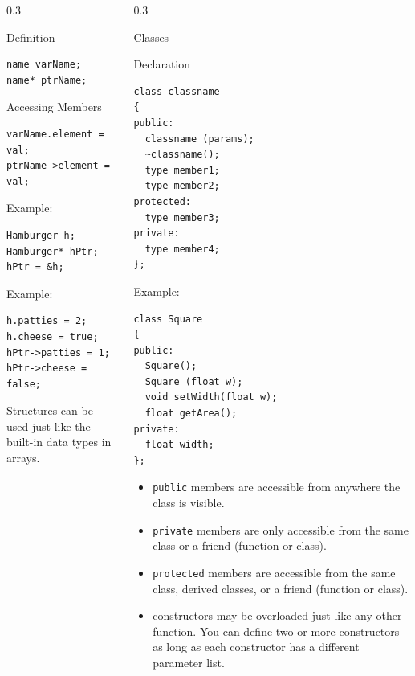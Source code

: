\documentclass[final]{beamer}
\begin{document}
\begin{frame}[t,fragile]
\begin{columns}[t,totalwidth=0.95\paperwidth, colsep=0.05\paperwidth]
\begin{column}{0.3\paperwidth}
\begin{block}{Definition}
\begin{lstlisting}
name varName;
name* ptrName;
\end{lstlisting}
\end{block}

\begin{block}{Accessing Members}
\begin{lstlisting}
varName.element = val;
ptrName->element = val;
\end{lstlisting}
Example:
\begin{lstlisting}
Hamburger h;
Hamburger* hPtr;
hPtr = &h;
\end{lstlisting}
Example:
\begin{lstlisting}
h.patties = 2;
h.cheese = true;
hPtr->patties = 1;
hPtr->cheese = false;
\end{lstlisting}
Structures can be used just like the built-in data types in arrays.
\end{block}

\end{column}
\begin{column}{0.3\paperwidth}

\begin{block}{Classes}
\end{block}

\begin{block}{Declaration}
\begin{lstlisting}
class classname
{
public:
  classname (params);
  ~classname();
  type member1;
  type member2;
protected:
  type member3;
private:
  type member4;
};
\end{lstlisting}
Example:
\begin{lstlisting}
class Square
{
public:
  Square();
  Square (float w);
  void setWidth(float w);
  float getArea();
private:
  float width;
};
\end{lstlisting}
\begin{itemize}
    \item \texttt{public} members are accessible from anywhere the class is visible.
    \item \texttt{private} members are only accessible from the same class or a friend (function or class).
    \item \texttt{protected} members are accessible from the same class, derived classes, or a friend (function or class).
    \item constructors may be overloaded just like any other function. You can define two or more constructors as long as each constructor has a different parameter list.
\end{itemize}
\end{block}


\end{column}
\end{columns}
\end{frame}
\end{document}
